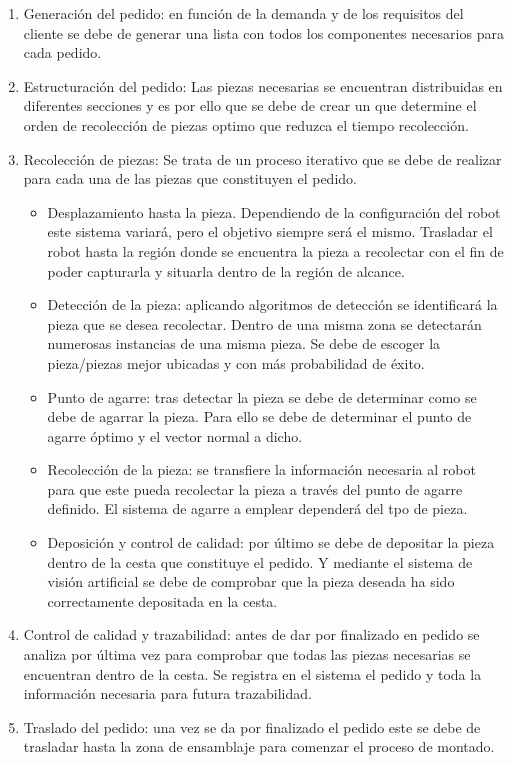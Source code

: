 \begin{enumerate}
\item Generación del pedido: en función de la demanda y de los requisitos del cliente se debe de generar una lista con todos los componentes necesarios para cada pedido.
\item Estructuración del pedido: Las piezas necesarias se encuentran distribuidas en diferentes secciones y es por ello que se debe de crear un  que determine el orden de recolección de piezas optimo que reduzca el tiempo recolección.
\item Recolección de piezas: Se trata de un proceso iterativo que se debe de realizar para cada una de las piezas que constituyen el pedido.
\begin{itemize}
\item Desplazamiento hasta la pieza. Dependiendo de la configuración del robot este sistema variará, pero el objetivo siempre será el mismo. Trasladar el robot hasta la región donde se encuentra la pieza a recolectar con el fin de poder capturarla y situarla dentro de la región de alcance.
\item Detección de la pieza: aplicando algoritmos de detección se identificará la pieza que se desea recolectar. Dentro de una misma zona se detectarán numerosas instancias de una misma pieza. Se debe de escoger la pieza/piezas mejor ubicadas y con más probabilidad de éxito.
\item Punto de agarre: tras detectar la pieza se debe de determinar como se debe de agarrar la pieza. Para ello se debe de determinar el punto de agarre óptimo y el vector normal a dicho.
\item Recolección de la pieza: se transfiere la información necesaria al robot para que este pueda recolectar la pieza a través del punto de agarre definido. El sistema de agarre a emplear dependerá del tpo de pieza.
\item Deposición y control de calidad: por último se debe de depositar la pieza dentro de la cesta que constituye el pedido. Y mediante el sistema de visión artificial se debe de comprobar que la pieza deseada ha sido correctamente depositada en la cesta.
\end{itemize}
\item Control de calidad y trazabilidad: antes de dar por finalizado en pedido se analiza por última vez para comprobar que todas las piezas necesarias se encuentran dentro de la cesta. Se registra en el sistema el pedido y toda la información necesaria para futura trazabilidad.
\item Traslado del pedido: una vez se da por finalizado el pedido este se debe de trasladar hasta la zona de ensamblaje para comenzar el proceso de montado.
\end{enumerate}

